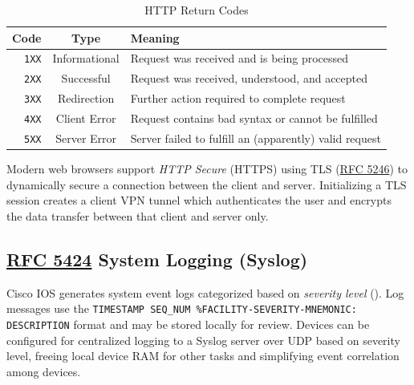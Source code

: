 \documentclass[12pt]{article}
\newcommand{\RFC}[1]{\href{https://datatracker.ietf.org/doc/html/rfc#1}{RFC #1}}
\begin{document}
	\begin{table}[H]
	\centering
	\caption{HTTP Return Codes \label{tab:HTTP CODES}}
	\begin{tabular}{r | c | l}\hline
	\textbf{Code}	& \textbf{Type}	& \textbf{Meaning}\\\hline
	\texttt{1XX}			& Informational			& Request was received and is being processed\\\hline
	\texttt{2XX}			& Successful			& Request was received, understood, and accepted\\\hline
	\texttt{3XX}			& Redirection			& Further action required to complete request\\\hline
	\texttt{4XX}			& Client Error			& Request contains bad syntax or cannot be fulfilled\\\hline
	\texttt{5XX}			& Server Error			& Server failed to fulfill an (apparently) valid request\\\hline
	\end{tabular}\end{table}
	Modern web browsers support \textit{HTTP Secure} (HTTPS) using TLS (\RFC{5246}) to dynamically secure a connection between the client and server. Initializing a TLS session creates a client VPN tunnel which authenticates the user and encrypts the data transfer between that client and server only.


	\subsection[RFC 5424 Syslog]{\RFC{5424} System Logging (Syslog) \label{subsec:SYSLOG}}
	Cisco IOS generates system event logs categorized based on \textit{severity level} (). Log messages use the \texttt{TIMESTAMP SEQ\_NUM \%FACILITY-SEVERITY-MNEMONIC: DESCRIPTION} format and may be stored locally for review. Devices can be configured for centralized logging to a Syslog server over UDP based on severity level, freeing local device RAM for other tasks and simplifying event correlation among devices.
\end{document}
